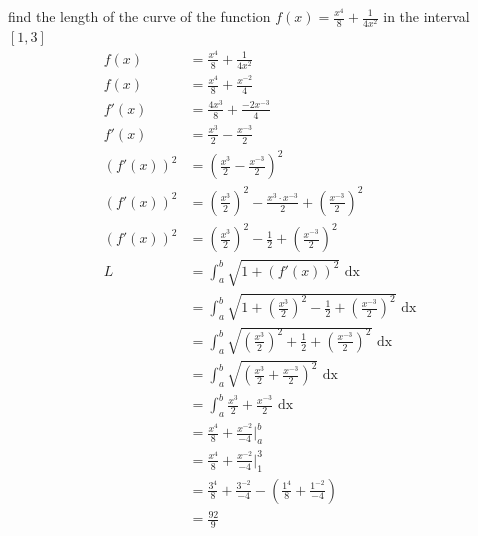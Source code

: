 \documentclass[a4paper,12pt]{article}
\newcommand{\?}{\stackrel{?}{=}}
\begin{document}
\begin{definition}
\begin{my_example}
find the length of the curve of the function \(f(x) = \frac{x^4}{8} + \frac{1}{4x^2}\) in the interval \([1,3]\)\\[0pt]
\begin{align*}
  f(x) &= \frac{x^4}{8} + \frac{1}{4x^2}\\
  f(x) &= \frac{x^4}{8} + \frac{x^{-2}}{4}\\
  f'(x) &= \frac{4x^3}{8} + \frac{-2x^{-3}}{4}\\
  f'(x) &= \frac{x^3}{2} - \frac{x^{-3}}{2}\\
  {(f'(x))}^2 &= \left(\frac{x^3}{2} - \frac{x^{-3}}{2}\right)^2\\
  {(f'(x))}^2 &= \left(\frac{x^3}{2}\right)^2 - \frac{x^3 \cdot x^{-3}}{2} + \left(\frac{x^{-3}}{2}\right)^2\\
  {(f'(x))}^2 &= \left(\frac{x^3}{2}\right)^2 - \frac12 + \left(\frac{x^{-3}}{2}\right)^2\\
  L &= \int_a^b \sqrt{1+(f'(x))^2} \text{ dx}\\
  &= \int_a^b \sqrt{1+\left(\frac{x^3}{2}\right)^2 - \frac12 + \left(\frac{x^{-3}}{2}\right)^2} \text{ dx}\\
  &= \int_a^b \sqrt{\left(\frac{x^3}{2}\right)^2 + \frac12 + \left(\frac{x^{-3}}{2}\right)^2} \text{ dx}\\
  &= \int_a^b \sqrt{\left(\frac{x^3}{2}+\frac{x^{-3}}{2}\right)^2} \text{ dx}\\
  &= \int_a^b \frac{x^3}{2}+\frac{x^{-3}}{2} \text{ dx}\\
  &= \frac{x^4}{8}+\frac{x^{-2}}{-4} \Big|_a^b\\
  &= \frac{x^4}{8}+\frac{x^{-2}}{-4} \Big|_1^3\\
  &= \frac{3^4}{8}+\frac{3^{-2}}{-4} - \left(\frac{1^4}{8}+\frac{1^{-2}}{-4}\right)\\
  &= \frac{92}{9}
\end{align*}
\end{my_example}


\end{definition}
\end{document}
